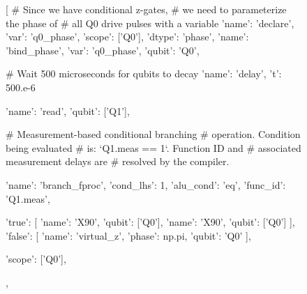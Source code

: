 \documentclass[journal]{IEEEtran}
\begin{document}
\begin{figure}
    \begin{python}
[
    # Since we have conditional z-gates,
    # we need to parameterize the phase of 
    # all Q0 drive pulses with a variable
    {'name': 'declare', 'var': 'q0_phase', 
        'scope': ['Q0'], 'dtype': 'phase'},
    {'name': 'bind_phase', 'var': 'q0_phase', 
        'qubit': 'Q0'},

    # Wait 500 microseconds for qubits to decay
    {'name': 'delay', 't': 500.e-6}
        
    {'name': 'read', 'qubit': ['Q1']},

    # Measurement-based conditional branching 
    # operation. Condition being evaluated 
    # is: `Q1.meas == 1`. Function ID and 
    # associated measurement delays are 
    # resolved by the compiler.
    {'name': 'branch_fproc', 'cond_lhs': 1, 
        'alu_cond': 'eq', 'func_id': 'Q1.meas', 
        
        'true': [
            {'name': 'X90', 'qubit': ['Q0']},
            {'name': 'X90', 'qubit': ['Q0']}
            ],
        'false': [
            {'name': 'virtual_z', 'phase': np.pi, 
                'qubit': 'Q0'}
        ], 
        
        'scope': ['Q0'],},


\end{python}
\end{figure}
\end{document}
